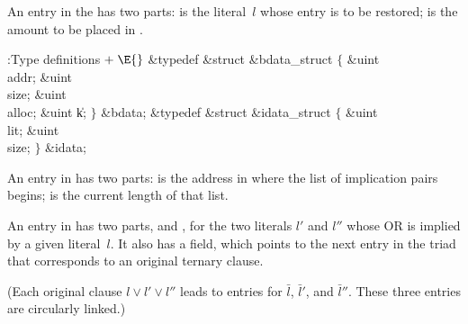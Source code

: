 An entry in the  has two parts:  is the literal~$l$
whose 
entry is to be restored;  is the amount to be placed in .

\Y\B\4:Type definitions\X${}\mathrel+\E{}$\6
\&{typedef} \&{struct} \&{bdata\_struct} ${}\{{}$\1\6
\&{uint} \\{addr};\6
\&{uint} \\{size};\6
\&{uint} \\{alloc};\6
\&{uint} \|k;\2\6
${}\}{}$ \&{bdata};\6
\&{typedef} \&{struct} \&{idata\_struct} ${}\{{}$\1\6
\&{uint} \\{lit};\6
\&{uint} \\{size};\2\6
${}\}{}$ \&{idata};\par
\fi

An entry in  has two parts:  is the address in %
 where
the list of implication pairs begins;  is the current length
of that list.

An entry in  has two parts,  and , for the two
literals
$l'$ and $l''$ whose {\mc OR} is implied by a given literal~$l$.
It also has a  field, which points to the next  entry
in the triad
that corresponds to an original ternary clause.

(Each original clause $l\lor l'\lor l''$ leads to  entries for $%
\bar l$,
$\bar l'$, and $\bar l''$. These three entries are circularly linked.)

